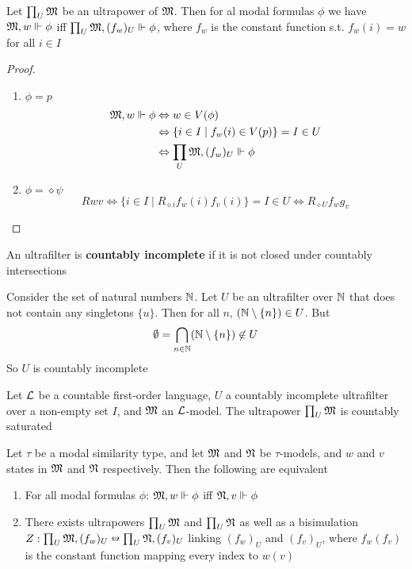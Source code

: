 \documentclass[11pt]{article}
\begin{document}
\begin{proposition}[]
Let \(\prod_U\mathfrak{M}\) be an ultrapower of \(\mathfrak{M}\). Then for al modal formulas \(\phi\)
we have \(\mathfrak{M},w\Vdash\phi\) iff \(\prod_U\mathfrak{M},(f_w)_U\Vdash\phi\), where
\(f_w\) is the constant function s.t. \(f_w(i)=w\) for all \(i\in I\)
\end{proposition}

\begin{proof}
\begin{enumerate}
\item \(\phi=p\)
\begin{align*}
\mathfrak{M},w\Vdash\phi&\Leftrightarrow w\in V(\phi)\\&\Leftrightarrow
\{i\in I\mid f_w(i)\in V(p)\}=I\in U\\&\Leftrightarrow
\prod_U\mathfrak{M},(f_w)_U\Vdash\phi
\end{align*}
\item \(\phi=\diamond\psi\)
\begin{equation*}
Rwv\Leftrightarrow\{i\in I\mid R_{\diamond i}f_w(i)f_v(i)\}=I\in U\Leftrightarrow
R_{\diamond U}f_wg_v
\end{equation*}
\end{enumerate}
\end{proof}

An ultrafilter is \textbf{countably incomplete} if it is not closed under countably intersections

\begin{examplle}[]
Consider the set of natural numbers \(\mathbb{N}\). Let \(U\) be an ultrafilter over
\(\mathbb{N}\) that does not contain any singletons \(\{u\}\). Then for all \(n\),
\((\mathbb{N}\setminus\{n\})\in U\). But
\begin{equation*}
\emptyset=\bigcap_{n\in\mathbb{N}}(\mathbb{N}\setminus\{n\})\not\in U
\end{equation*}
So \(U\) is countably incomplete
\end{examplle}

\begin{lemma}[]
\label{lemma2.73}
Let \(\mathcal{L}\) be a countable first-order language, \(U\) a countably
incomplete ultrafilter over a non-empty set \(I\), and \(\mathfrak{M}\) an
\(\mathcal{L}\)-model. The ultrapower \(\prod_U\mathfrak{M}\) is countably saturated
\end{lemma}

\begin{theorem}[]
\label{thm2.74}
Let \(\tau\) be a modal similarity type, and let \(\mathfrak{M}\) and \(\mathfrak{N}\) be
\(\tau\)-models, and \(w\) and \(v\) states in \(\mathfrak{M}\) and \(\mathfrak{N}\)
respectively. Then the following are equivalent
\begin{enumerate}
\item For all modal formulas \(\phi\): \(\mathfrak{M},w\Vdash\phi\) iff \(\mathfrak{N},v\Vdash\phi\)
\item There exists ultrapowers \(\prod_U\mathfrak{M}\) and \(\prod_U\mathfrak{N}\) as well as a
bisimulation \(Z:\prod_U\mathfrak{M},(f_w)_U\leftrightarroweq\prod_U\mathfrak{N},(f_v)_U\)
linking \((f_w)_U\) and \((f_v)_U\), where \(f_w(f_v)\) is the constant
function mapping every index to \(w(v)\)
\end{enumerate}
\end{theorem}
\end{document}
